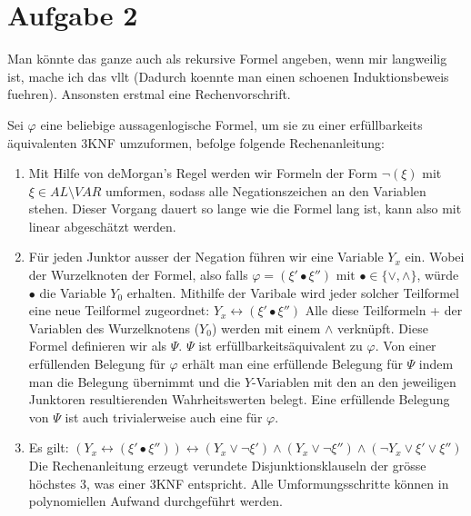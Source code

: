 \documentclass[a4paper,10pt]{article}
\begin{document}
\section*{Aufgabe 2}
	Man könnte das ganze auch als rekursive Formel angeben, wenn mir langweilig ist, 		mache ich das vllt (Dadurch koennte man einen schoenen Induktionsbeweis fuehren). 
	Ansonsten erstmal eine Rechenvorschrift.

	Sei $\varphi$ eine beliebige aussagenlogische Formel, um sie zu einer erf\"ullbarkeits
	\"aquivalenten 3KNF umzuformen, befolge folgende Rechenanleitung:
	\begin{enumerate}
		\item 	Mit Hilfe von deMorgan's Regel werden wir Formeln der Form 
			$\lnot(\xi)$ mit $\xi \in AL\setminus VAR$ umformen, sodass alle 
			Negationszeichen an den Variablen stehen. 
			Dieser Vorgang dauert so lange wie die Formel lang ist, kann also mit
			linear abgesch\"atzt werden.
		\item   F\"ur jeden Junktor ausser der Negation f\"uhren wir eine 
			Variable $Y_x$ ein. Wobei der Wurzelknoten der Formel, also falls 
			$\varphi = (\xi' \bullet \xi'') \text{ mit } \bullet \in \{\lor, \land\}$, 
			würde $\bullet$ die Variable 
			$Y_0$ erhalten. Mithilfe der Varibale wird jeder solcher Teilformel 
			eine neue Teilformel zugeordnet: 
			$Y_x \leftrightarrow (\xi' \bullet \xi'')$
			Alle diese Teilformeln + der Variablen des Wurzelknotens ($Y_0$) werden mit einem $\land$ verkn\"upft. Diese 
			Formel definieren wir als $\Psi$. 
			$\Psi$ ist erfüllbarkeits\"aquivalent zu 
			$\varphi$. Von einer erfüllenden Belegung f\"ur $\varphi$ erh\"alt 
			man eine erfüllende Belegung f\"ur $\Psi$ indem man die Belegung 
			\"ubernimmt und die $Y$-Variablen mit den an den jeweiligen Junktoren 
			resultierenden Wahrheitswerten belegt. Eine erf\"ullende Belegung von 
			$\Psi$ ist auch trivialerweise auch eine f\"ur $\varphi$.
		\item	Es gilt: $(Y_x \leftrightarrow (\xi' \bullet \xi'')) 
			\leftrightarrow (Y_x \lor \lnot \xi') \land (Y_x \lor \lnot \xi'') 				\land (\lnot Y_x \lor \xi' \lor \xi'')$
Die Rechenanleitung erzeugt verundete Disjunktionsklauseln der gr\"osse h\"ochstes 3, was einer 3KNF entspricht. Alle Umformungsschritte k\"onnen in polynomiellen Aufwand durchgeführt werden.
			
	\end{enumerate}
\end{document}
